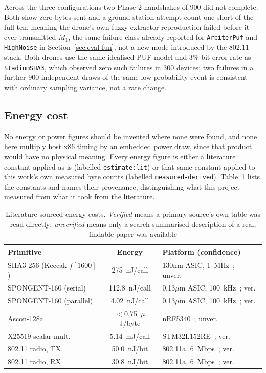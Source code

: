 \documentclass[journal]{IEEEtran}
\begin{document}
Across the three configurations two Phase-2 handshakes of 900 did not complete.
Both show zero bytes sent and a ground-station attempt count one short of the
full ten, meaning the drone's own fuzzy-extractor reproduction failed before it
ever transmitted $M_1$, the same failure class already reported for
\texttt{ArbiterPuf} and \texttt{HighNoise} in Section~\ref{sec:eval-fun}, not a
new mode introduced by the 802.11 stack. Both drones use the same idealised PUF
model and 3\% bit-error rate as \texttt{StadiumSHA3}, which observed zero such
failures in 300 devices; two failures in a further 900 independent draws of the
same low-probability event is consistent with ordinary sampling variance, not a
rate change.

\subsection{Energy cost}

No energy or power figures should be invented where none were found, and none
here multiply host x86 timing by an embedded power draw, since that product
would have no physical meaning. Every energy figure is either a literature
constant applied as-is (labelled \texttt{estimate:lit}) or that same constant
applied to this work's own measured byte counts (labelled
\texttt{measured-derived}). Table~\ref{tab:energy} lists the constants and names
their provenance, distinguishing what this project measured from what it took
from the literature.

\begin{table}[H]
\centering
\caption{Literature-sourced energy costs. \emph{Verified} means a primary
source's own table was read directly; \emph{unverified} means only a
search-summarised description of a real, findable paper was available}
\label{tab:energy}
\scriptsize
\setlength{\tabcolsep}{2pt}
\begin{tabular}{@{}p{3.2cm}cp{3.85cm}@{}}
\toprule
\textbf{Primitive} & \textbf{Energy} & \textbf{Platform (confidence)} \\
\midrule
SHA3-256 (Keccak-$f[1600]$) & 275~nJ/call & 130nm ASIC, 1~MHz~\cite{sha3_energy_pessl}; unver.\ \\
SPONGENT-160 (serial) & 112.8~nJ/call & 0.13$\mu$m ASIC, 100~kHz~\cite{spongent_original}; ver. \\
SPONGENT-160 (parallel) & 4.02~nJ/call & 0.13$\mu$m ASIC, 100~kHz~\cite{spongent_original}; ver. \\
Ascon-128a & $<$0.75~$\mu$J/byte & nRF5340~\cite{ascon_energy_sorescu}; unver. \\
X25519 scalar mult.\ & 5.14~mJ/call & STM32L152RE~\cite{x25519_energy_franck}; ver. \\
802.11 radio, TX & 50.0~nJ/bit & 802.11a, 6~Mbps~\cite{radio_energy_ergen}; ver. \\
802.11 radio, RX & 30.8~nJ/bit & 802.11a, 6~Mbps~\cite{radio_energy_ergen}; ver. \\
\bottomrule
\end{tabular}
\end{table}
\end{document}
